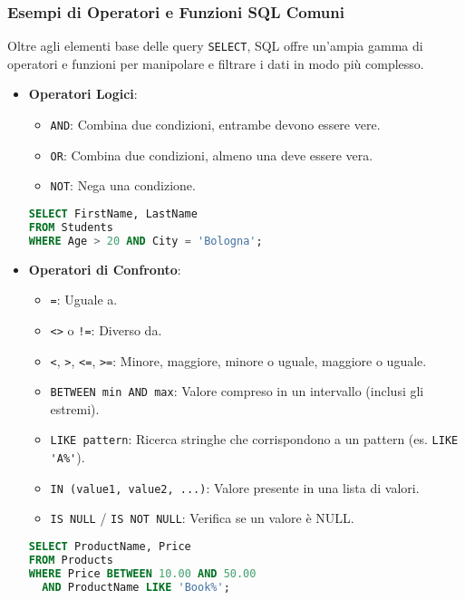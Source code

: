 \subsubsection{Esempi di Operatori e Funzioni SQL Comuni}
Oltre agli elementi base delle query \lstinline{SELECT}, SQL offre un'ampia gamma di operatori e funzioni per manipolare e filtrare i dati in modo più complesso.
\begin{itemize}
    \item \textbf{Operatori Logici}:
    \begin{itemize}
        \item \lstinline{AND}: Combina due condizioni, entrambe devono essere vere.
        \item \lstinline{OR}: Combina due condizioni, almeno una deve essere vera.
        \item \lstinline{NOT}: Nega una condizione.
    \end{itemize}
    \begin{lstlisting}[language=SQL, caption={Esempio Operatori Logici}]
SELECT FirstName, LastName
FROM Students
WHERE Age > 20 AND City = 'Bologna';
    \end{lstlisting}
    \item \textbf{Operatori di Confronto}:
    \begin{itemize}
        \item \lstinline{=}: Uguale a.
        \item \lstinline{<>} o \lstinline{!=}: Diverso da.
        \item \lstinline{<}, \lstinline{>}, \lstinline{<=}, \lstinline{>=}: Minore, maggiore, minore o uguale, maggiore o uguale.
        \item \lstinline{BETWEEN min AND max}: Valore compreso in un intervallo (inclusi gli estremi).
        \item \lstinline{LIKE pattern}: Ricerca stringhe che corrispondono a un pattern (es. \lstinline{LIKE 'A%'}).
        \item \lstinline{IN (value1, value2, ...)}: Valore presente in una lista di valori.
        \item \lstinline{IS NULL} / \lstinline{IS NOT NULL}: Verifica se un valore è NULL.
    \end{itemize}
    \begin{lstlisting}[language=SQL, caption={Esempio Operatori di Confronto}]
SELECT ProductName, Price
FROM Products
WHERE Price BETWEEN 10.00 AND 50.00
  AND ProductName LIKE 'Book%';


\end{lstlisting}
\end{itemize}
